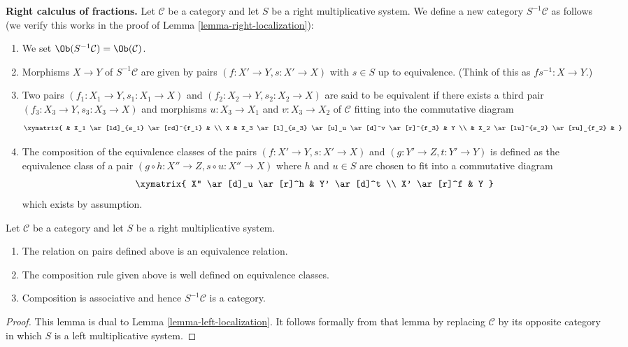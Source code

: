 \noindent
{\bf Right calculus of fractions.}
Let $\mathcal{C}$ be a category and let $S$ be a right multiplicative
system. We define a new category $S^{-1}\mathcal{C}$ as follows
(we verify this works in the proof of
Lemma \ref{lemma-right-localization}):
\begin{enumerate}
\item We set $\Ob(S^{-1}\mathcal{C}) = \Ob(\mathcal{C})$.
\item Morphisms $X \to Y$ of $S^{-1}\mathcal{C}$ are given by pairs
$(f : X' \to Y, s : X' \to X)$ with $s \in S$ up to equivalence.
(Think of this as $fs^{-1} : X \to Y$.)
\item Two pairs $(f_1 : X_1 \to Y, s_1 : X_1 \to X)$ and
$(f_2 : X_2 \to Y, s_2 : X_2 \to X)$ are said to be equivalent
if there exists a third pair $(f_3 : X_3 \to Y, s_3 : X_3 \to X)$
and morphisms $u : X_3 \to X_1$ and $v : X_3 \to X_2$ of $\mathcal{C}$
fitting into the commutative diagram
$$
\xymatrix{
 & X_1 \ar[ld]_{s_1} \ar[rd]^{f_1} & \\
X &
X_3 \ar[l]_{s_3} \ar[u]_u \ar[d]^v \ar[r]^{f_3} &
Y \\
& X_2 \ar[lu]^{s_2} \ar[ru]_{f_2} &
}
$$
\item The composition of the equivalence classes of the pairs
$(f : X' \to Y, s : X' \to X)$ and $(g : Y' \to Z, t : Y' \to Y)$
is defined as the equivalence class of a pair
$(g \circ h : X'' \to Z, s \circ u : X'' \to X)$
where $h$ and $u \in S$ are chosen to fit into a commutative diagram
$$
\xymatrix{
X'' \ar[d]_u \ar[r]^h & Y' \ar[d]^t \\
X' \ar[r]^f & Y
}
$$
which exists by assumption.
\end{enumerate}

\begin{lemma}
\label{lemma-right-localization}
Let $\mathcal{C}$ be a category and let $S$ be a right multiplicative
system.
\begin{enumerate}
\item The relation on pairs defined above is an equivalence relation.
\item The composition rule given above is well defined on equivalence
classes.
\item Composition is associative and hence $S^{-1}\mathcal{C}$
is a category.
\end{enumerate}
\end{lemma}

\begin{proof}
This lemma is dual to
Lemma \ref{lemma-left-localization}.
It follows formally from that lemma by replacing
$\mathcal{C}$ by its opposite category in which
$S$ is a left multiplicative system.
\end{proof}

